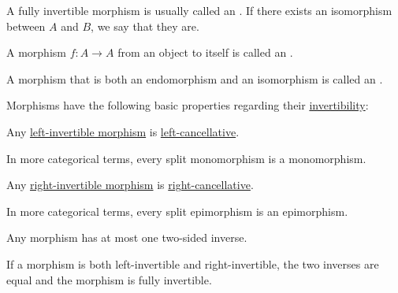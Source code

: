 \begin{definition}
\begin{thmenum}
    A fully invertible morphism is usually called an . If there exists an isomorphism between \( A \) and \( B \), we say that they are.

     A morphism \( f: A \to A \) from an object to itself is called an .

     A morphism that is both an endomorphism and an isomorphism is called an .
  \end{thmenum}
\end{definition}

\begin{proposition}\label{thm:morphism_invertibility_properties}
  Morphisms have the following basic properties regarding their \hyperref[def:morphism_invertibility]{invertibility}:

  \begin{thmenum}
     Any \hyperref[def:morphism_invertibility/left_invertible]{left-invertible morphism} is \hyperref[def:morphism_invertibility/left_cancellative]{left-cancellative}.

    In more categorical terms, every split monomorphism is a monomorphism.

     Any \hyperref[def:morphism_invertibility/right_invertible]{right-invertible morphism} is \hyperref[def:morphism_invertibility/right_cancellative]{right-cancellative}.

    In more categorical terms, every split epimorphism is an epimorphism.

     Any morphism has at most one two-sided inverse.

     If a morphism is both left-invertible and right-invertible, the two inverses are equal and the morphism is fully invertible.
  \end{thmenum}
\end{proposition}
